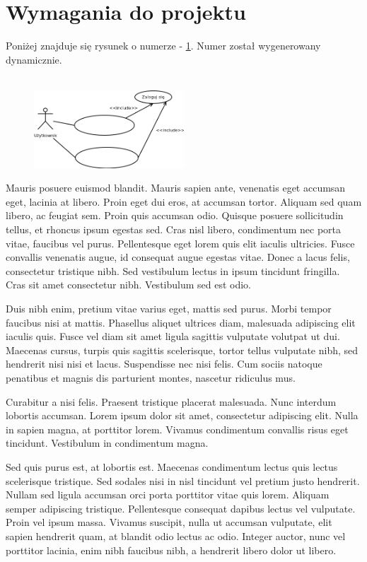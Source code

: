 \section{Wymagania do projektu}	
Poniżej znajduje się rysunek o numerze - \ref{rys:usecase2}. Numer został wygenerowany dynamicznie.
\begin{figure}[h!]
	\centering
	\HRule\\[1.5em]
		\includegraphics[width=0.5\textwidth]{img/usecase2.png}
	\\[0.3em]\HRule
	\label{rys:usecase2}
\end{figure}

Mauris posuere euismod blandit. Mauris sapien ante, venenatis eget accumsan eget, lacinia at libero. Proin eget dui eros, at accumsan tortor. Aliquam sed quam libero, ac feugiat sem. Proin quis accumsan odio. Quisque posuere sollicitudin tellus, et rhoncus ipsum egestas sed. Cras nisl libero, condimentum nec porta vitae, faucibus vel purus. Pellentesque eget lorem quis elit iaculis ultricies. Fusce convallis venenatis augue, id consequat augue egestas vitae. Donec a lacus felis, consectetur tristique nibh. Sed vestibulum lectus in ipsum tincidunt fringilla. Cras sit amet consectetur nibh. Vestibulum sed est odio. 

Duis nibh enim, pretium vitae varius eget, mattis sed purus. Morbi tempor faucibus nisi at mattis. Phasellus aliquet ultrices diam, malesuada adipiscing elit iaculis quis. Fusce vel diam sit amet ligula sagittis vulputate volutpat ut dui. Maecenas cursus, turpis quis sagittis scelerisque, tortor tellus vulputate nibh, sed hendrerit nisi nisi et lacus. Suspendisse nec nisi felis. Cum sociis natoque penatibus et magnis dis parturient montes, nascetur ridiculus mus. 

Curabitur a nisi felis. Praesent tristique placerat malesuada. Nunc interdum lobortis accumsan. Lorem ipsum dolor sit amet, consectetur adipiscing elit. Nulla in sapien magna, at porttitor lorem. Vivamus condimentum convallis risus eget tincidunt. Vestibulum in condimentum magna. 

Sed quis purus est, at lobortis est. Maecenas condimentum lectus quis lectus scelerisque tristique. Sed sodales nisi in nisl tincidunt vel pretium justo hendrerit. Nullam sed ligula accumsan orci porta porttitor vitae quis lorem. Aliquam semper adipiscing tristique. Pellentesque consequat dapibus lectus vel vulputate. Proin vel ipsum massa. Vivamus suscipit, nulla ut accumsan vulputate, elit sapien hendrerit quam, at blandit odio lectus ac odio. Integer auctor, nunc vel porttitor lacinia, enim nibh faucibus nibh, a hendrerit libero dolor ut libero. 

